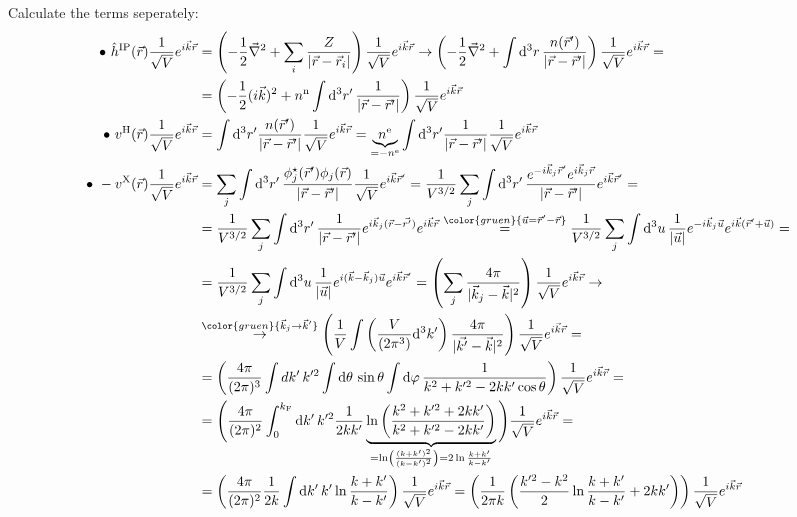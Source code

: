 \documentclass{article}
\newcommand{\diff}{\mathrm{d}}
\newcommand{\lr}[1]{\left(#1\right)}
\newcommand{\comment}[1]{{\color{gruen} {#1}}}
\begin{document}
{	Calculate the terms seperately:
		\begin{align*}
			\bullet \ \hat{h}^\text{IP}(\vec{r}) \frac{1}{\sqrt{V}} e^{i\vec{k}\vec{r}} &= \lr{ -\frac{1}{2}\vec{\nabla}^2 + \sum_i \frac{Z}{|\vec{r} - \vec{r}_i|} } \frac{1}{\sqrt{V}} e^{i\vec{k}\vec{r}} \to \lr{ -\frac{1}{2}\vec{\nabla}^2 + \int \diff^3r \, \frac{n(\vec{r}')}{|\vec{r} - \vec{r}'|} } \frac{1}{\sqrt{V}} e^{i\vec{k}\vec{r}} = \\
			&= \lr{ -\frac{1}{2}(i\vec{k})^2 + n^\text{n} \int \diff^3r' \, \frac{1}{|\vec{r} - \vec{r}'|} } \frac{1}{\sqrt{V}} e^{i\vec{k}\vec{r}} \\
			\bullet \ v^\text{H}(\vec{r}) \frac{1}{\sqrt{V}} e^{i\vec{k}\vec{r}} &= \int \diff^3r' \frac{n(\vec{r}')}{|\vec{r} - \vec{r}'|} \frac{1}{\sqrt{V}} e^{i\vec{k}\vec{r}} = \underbrace{ n^\text{e} }_{=-n^\text{e}} \int \diff^3r' \frac{1}{|\vec{r} - \vec{r}'|} \frac{1}{\sqrt{V}} e^{i\vec{k}\vec{r}} \\
			\bullet \ -v^\text{X}(\vec{r}) \frac{1}{\sqrt{V}} e^{i\vec{k}\vec{r}} &= \sum_j \int \diff^3r' \, \frac{\phi_j^\star(\vec{r}') \phi_j(\vec{r})}{|\vec{r} - \vec{r}'|} \frac{1}{\sqrt{V}} e^{i\vec{k}\vec{r}'} = \frac{1}{V^{3/2}} \sum_j \int \diff^3r' \, \frac{e^{-i\vec{k}_j\vec{r}'} e^{i\vec{k}_j\vec{r}}}{|\vec{r} - \vec{r}'|} e^{i\vec{k}\vec{r}'} = \\
			&= \frac{1}{V^{3/2}} \sum_j \int \diff^3r' \, \frac{1}{|\vec{r} - \vec{r}'|} e^{i\vec{k}_j(\vec{r} - \vec{r'})} e^{i\vec{k}\vec{r}} \stackrel{ \comment{\vec{u}=\vec{r}'-\vec{r}} }{=} \frac{1}{V^{3/2}} \sum_j \int \diff^3u \, \frac{1}{|\vec{u}|} e^{-i\vec{k}_j\vec{u}} e^{i\vec{k}(\vec{r}'+\vec{u})} = \\
			&= \frac{1}{V^{3/2}} \sum_j \int \diff^3u \, \frac{1}{|\vec{u}|} e^{i(\vec{k} - \vec{k}_j) \vec{u}} e^{i\vec{k}\vec{r}'} = \lr{ \sum_j \frac{4\pi}{|\vec{k}_j - \vec{k}|^2} } \frac{1}{\sqrt{V}} e^{i\vec{k}\vec{r}} \to \\
			&\stackrel{\comment{\vec{k}_j\to\vec{k}'}}{\to} \lr{ \frac{1}{V} \int \lr{ \frac{V}{(2\pi^3)}\diff^3k' } \frac{4\pi}{|\vec{k'} - \vec{k}|^2} } \frac{1}{\sqrt{V}} e^{i\vec{k}\vec{r}} = \\
			&= \lr{ \frac{4\pi}{(2\pi)^3} \int dk' \, k'^2 \int \diff\theta \, \sin\theta \int \diff\varphi \, \frac{1}{k^2 + k'^2 - 2kk'\cos\theta}} \frac{1}{\sqrt{V}} e^{i\vec{k}\vec{r}} = \\
			&= \Bigg( \frac{4\pi}{(2\pi)^2} \int_0^{k_\text{F}} \diff k' \, k'^2 \frac{1}{2kk'} \underbrace{ \ln\lr{ \frac{ k^2 + k'^2 + 2kk' }{k^2 + k'^2 - 2kk'} } }_{=\ln\lr{ \frac{(k+k')^2}{(k-k')^2} } = 2\ln\frac{k+k'}{k-k'}} \Bigg) \frac{1}{\sqrt{V}} e^{i\vec{k}\vec{r}} = \\
			&= \lr{ \frac{4\pi}{(2\pi)^2} \frac{1}{2k} \int \diff k' \, k' \ln\frac{k+k'}{k-k'} } \frac{1}{\sqrt{V}} e^{i\vec{k}\vec{r}} = \lr{ \frac{1}{2\pi k} \lr{ \frac{k'^2 - k^2}{2} \ln\frac{k+k'}{k-k'} + 2kk' } } \frac{1}{\sqrt{V}} e^{i\vec{k}\vec{r}}
		\end{align*}
	
}
\end{document}
